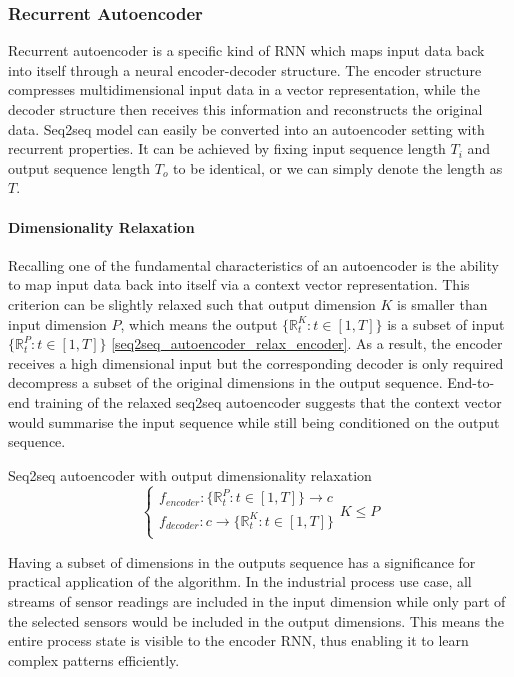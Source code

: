 \documentclass[11pt]{article} %
\theoremstyle{plain}
\theoremstyle{definition}
\begin{document}
\subsubsection{Recurrent Autoencoder}

Recurrent autoencoder is a specific kind of RNN which maps input data back into itself through a neural encoder-decoder structure. The encoder structure compresses multidimensional input data in a vector representation, while the decoder structure then receives this information and reconstructs the original data. Seq2seq model can easily be converted into an autoencoder setting with recurrent properties. It can be achieved by fixing input sequence length \(T_i\) and output sequence length \(T_o\) to be identical, or we can simply denote the length as \(T\).

\paragraph{Dimensionality Relaxation}

Recalling one of the fundamental characteristics of an autoencoder is the ability to map input data back into itself via a context vector representation. This criterion can be slightly relaxed such that output dimension \(K\) is smaller than input dimension \(P\), which means the output \(\{\mathbb{R}_t^K:t\in [1,T] \}\) is a subset of input \(\{\mathbb{R}_t^P:t\in [1,T] \}\) \eqref{seq2seq_autoencoder_relax_encoder}. As a result, the encoder receives a high dimensional input but the corresponding decoder is only required decompress a subset of the original dimensions in the output sequence. End-to-end training of the relaxed seq2seq autoencoder suggests that the context vector would summarise the input sequence while still being conditioned on the output sequence.

Seq2seq autoencoder with output dimensionality relaxation
\begin{equation}
\label{seq2seq_autoencoder_relax_encoder}
\begin{cases} 
f_{encoder} : \{  \mathbb{R}_t^P:t \in [1, T] \} \rightarrow c \\
f_{decoder} : c \rightarrow \{  \mathbb{R}_t^K:t \in [1, T] \} \\
\end{cases} K \leqslant P
\end{equation}

Having a subset of dimensions in the outputs sequence has a significance for practical application of the algorithm. In the industrial process use case, all streams of sensor readings are included in the input dimension while only part of the selected sensors would be included in the output dimensions. This means the entire process state is visible to the encoder RNN, thus enabling it to learn complex patterns efficiently.
\end{document}
